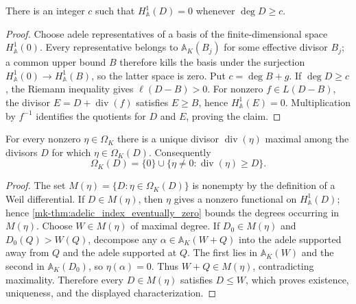 \begin{theorem}
  \label{mk-thm:adelic_index_eventually_zero}
  \notready
  There is an integer \(c\) such that
  \(H^1_{\mathbb A}(D)=0\) whenever \(\deg D\ge c\).
\end{theorem}
\begin{proof}
  Choose adele representatives of a basis of the finite-dimensional space
  \(H^1_{\mathbb A}(0)\).  Every representative belongs to
  \(\mathbb A_K(B_j)\) for some effective divisor \(B_j\); a common upper
  bound \(B\) therefore kills the basis under the surjection
  \(H^1_{\mathbb A}(0)\to H^1_{\mathbb A}(B)\), so the latter space is zero.
  Put \(c=\deg B+g\).  If \(\deg D\ge c\), the Riemann inequality gives
  \(\ell(D-B)>0\).  For nonzero \(f\in L(D-B)\), the divisor
  \(E=D+\operatorname{div}(f)\) satisfies \(E\ge B\), hence
  \(H^1_{\mathbb A}(E)=0\).  Multiplication by \(f^{-1}\) identifies the
  quotients for \(D\) and \(E\), proving the claim.
\end{proof}

\begin{theorem}
  \label{mk-thm:adelic_weil_differential_divisor}
  \notready
  For every nonzero \(\eta\in\Omega_K\) there is a unique divisor
  \(\operatorname{div}(\eta)\) maximal among the divisors \(D\) for which
  \(\eta\in\Omega_K(D)\).  Consequently
  \[
    \Omega_K(D)=\{0\}\cup
      \{\eta\ne0:\operatorname{div}(\eta)\ge D\}.
  \]
\end{theorem}
\begin{proof}
  The set \(M(\eta)=\{D:\eta\in\Omega_K(D)\}\) is nonempty by the
  definition of a Weil differential.  If \(D\in M(\eta)\), then \(\eta\)
  gives a nonzero functional on \(H^1_{\mathbb A}(D)\); hence
  \ref{mk-thm:adelic_index_eventually_zero} bounds the degrees occurring in
  \(M(\eta)\).  Choose \(W\in M(\eta)\) of maximal degree.  If
  \(D_0\in M(\eta)\) and \(D_0(Q)>W(Q)\), decompose any
  \(\alpha\in\mathbb A_K(W+Q)\) into the adele supported away from \(Q\)
  and the adele supported at \(Q\).  The first lies in \(\mathbb A_K(W)\)
  and the second in \(\mathbb A_K(D_0)\), so \(\eta(\alpha)=0\).  Thus
  \(W+Q\in M(\eta)\), contradicting maximality.  Therefore every
  \(D\in M(\eta)\) satisfies \(D\le W\), which proves existence,
  uniqueness, and the displayed characterization.
\end{proof}

